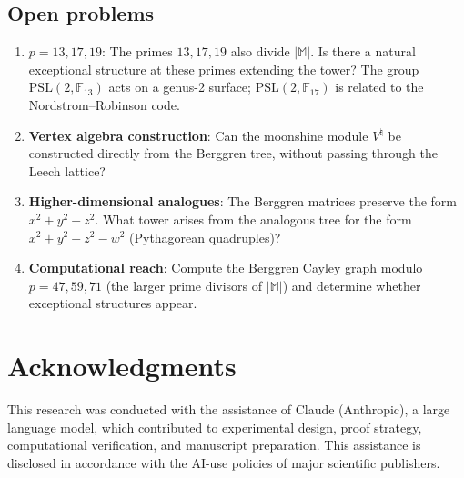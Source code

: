 \documentclass[12pt]{amsart}
\theoremstyle{definition}
\theoremstyle{remark}
\newcommand{\PSL}{\mathrm{PSL}}
\newcommand{\Monster}{\mathbb{M}}
\begin{document}
\subsection{Open problems}

\begin{enumerate}
\item \textbf{$p = 13, 17, 19$}: The primes $13, 17, 19$ also divide
  $|\Monster|$.  Is there a natural exceptional structure at these primes
  extending the tower?  The group $\PSL(2,\mathbb{F}_{13})$ acts on a
  genus-2 surface; $\PSL(2,\mathbb{F}_{17})$ is related to the Nordstrom--Robinson
  code.

\item \textbf{Vertex algebra construction}: Can the moonshine module
  $V^\natural$ be constructed directly from the Berggren tree, without
  passing through the Leech lattice?

\item \textbf{Higher-dimensional analogues}: The Berggren matrices preserve
  the form $x^2 + y^2 - z^2$.  What tower arises from the analogous tree
  for the form $x^2 + y^2 + z^2 - w^2$ (Pythagorean quadruples)?

\item \textbf{Computational reach}: Compute the Berggren Cayley graph
  modulo $p = 47, 59, 71$ (the larger prime divisors of $|\Monster|$)
  and determine whether exceptional structures appear.
\end{enumerate}

\section*{Acknowledgments}

This research was conducted with the assistance of Claude (Anthropic),
a large language model, which contributed to experimental design,
proof strategy, computational verification, and manuscript preparation.
This assistance is disclosed in accordance with the AI-use policies of
major scientific publishers.
\end{document}
